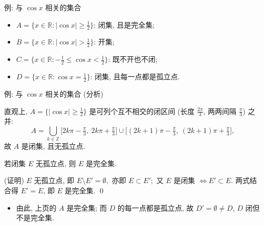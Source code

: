 
\begin{frame}{例: 与 $\cos x$ 相关的集合}

\begin{eg}[开集、闭集与完全集]
\begin{itemize}
\item $A = \{x \in \mathbb{R} : |\cos x| \geqslant \tfrac{1}{2}\}$: \alert{闭集}, 且是完全集;
\item $B = \{x \in \mathbb{R} : |\cos x| > \tfrac{1}{2}\}$: \alert{开集};
\item $C = \{x \in \mathbb{R} : -\tfrac{1}{2} \leqslant \cos x < \tfrac{1}{2}\}$: \alert{既不开也不闭};
\item $D = \{x \in \mathbb{R} : \cos x = \tfrac{1}{2}\}$: \alert{闭集}, 且每一点都是孤立点.
\end{itemize}
\end{eg}

\pause

\begin{center}
\end{center}

\end{frame}


\begin{frame}{例: 与 $\cos x$ 相关的集合 (分析)}

直观上, $A = \{|\cos x| \geqslant \tfrac{1}{2}\}$ 是可列个互不相交的闭区间 (长度 $\tfrac{2\pi}{3}$, 两两间隔 $\tfrac{\pi}{3}$) 之并:
\[
A = \bigcup_{k \in \mathbb{Z}} \bigl[2k\pi - \tfrac{\pi}{3},\ 2k\pi + \tfrac{\pi}{3}\bigr] \cup \bigl[(2k+1)\pi - \tfrac{\pi}{3},\ (2k+1)\pi + \tfrac{\pi}{3}\bigr],
\]
故 $A$ 是闭集, 且无孤立点.

\pause

\begin{cor}
若闭集 $E$ 无孤立点, 则 $E$ 是完全集.
\end{cor}

\startproof[bg=yellow, fg=red](证明)
$E$ 无孤立点, 即 $E \setminus E' = \emptyset,$ 亦即 $E \subset E';$ 又 $E$ 是闭集 $\iff E' \subset E.$ 两式结合得 $E' = E$, 即 $E$ 是完全集.
\qed

\begin{itemize}
\item 由此, 上页的 $A$ 是完全集; 而 $D$ 的每一点都是孤立点, 故 $D' = \emptyset \neq D$, $D$ 闭但不是完全集.
\end{itemize}

\end{frame}

